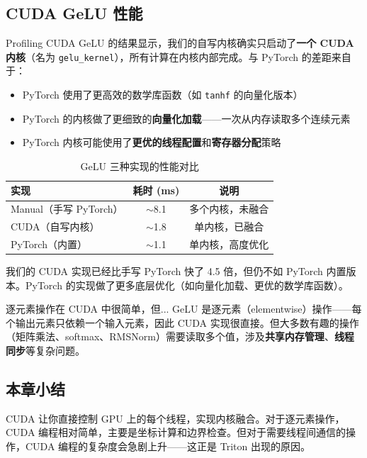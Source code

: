 \documentclass[a4paper]{article}
\begin{document}
\subsection{CUDA GeLU 性能}

Profiling CUDA GeLU 的结果显示，我们的自写内核确实只启动了\textbf{一个 CUDA 内核}（名为 \texttt{gelu\_kernel}），所有计算在内核内部完成。与 PyTorch 的差距来自于：

\begin{itemize}
    \item PyTorch 使用了更高效的数学库函数（如 \texttt{tanhf} 的向量化版本）
    \item PyTorch 的内核做了更细致的\textbf{向量化加载}——一次从内存读取多个连续元素
    \item PyTorch 内核可能使用了\textbf{更优的线程配置}和\textbf{寄存器分配}策略
\end{itemize}

\begin{table}[H]
\centering
\begin{tabular}{lcc}
\toprule
\textbf{实现} & \textbf{耗时 (ms)} & \textbf{说明} \\
\midrule
Manual（手写 PyTorch） & $\sim$8.1 & 多个内核，未融合 \\
CUDA（自写内核） & $\sim$1.8 & 单内核，已融合 \\
PyTorch（内置） & $\sim$1.1 & 单内核，高度优化 \\
\bottomrule
\end{tabular}
\caption{GeLU 三种实现的性能对比}
\end{table}

我们的 CUDA 实现已经比手写 PyTorch 快了 4.5 倍，但仍不如 PyTorch 内置版本。PyTorch 的实现做了更多底层优化（如向量化加载、更优的数学库函数）。

\begin{warningbox}{逐元素操作在 CUDA 中很简单，但...}
GeLU 是逐元素（elementwise）操作——每个输出元素只依赖一个输入元素，因此 CUDA 实现很直接。但大多数有趣的操作（矩阵乘法、softmax、RMSNorm）需要读取多个值，涉及\textbf{共享内存管理}、\textbf{线程同步}等复杂问题。
\end{warningbox}

\subsection{本章小结}

CUDA 让你直接控制 GPU 上的每个线程，实现内核融合。对于逐元素操作，CUDA 编程相对简单，主要是坐标计算和边界检查。但对于需要线程间通信的操作，CUDA 编程的复杂度会急剧上升——这正是 Triton 出现的原因。
\end{document}
